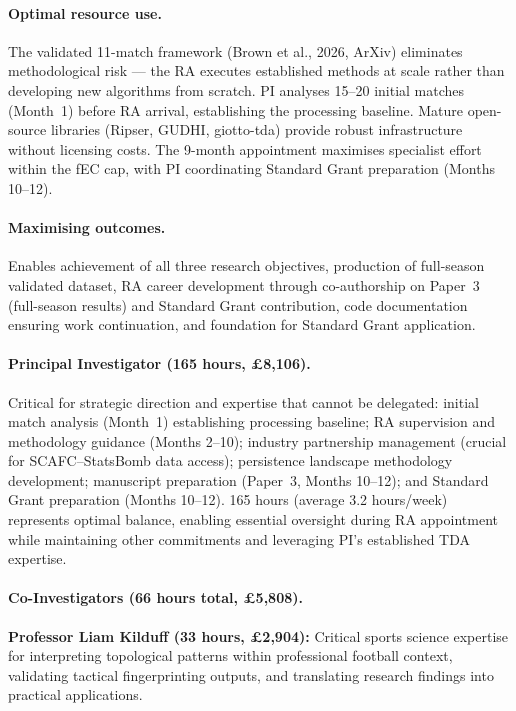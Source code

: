 \paragraph{Optimal resource use.}
The validated 11-match framework (Brown et al., 2026, ArXiv) eliminates methodological risk --- the RA executes established methods at scale rather than developing new algorithms from scratch. PI analyses 15--20 initial matches (Month~1) before RA arrival, establishing the processing baseline. Mature open-source libraries (Ripser, GUDHI, giotto-tda) provide robust infrastructure without licensing costs. The 9-month appointment maximises specialist effort within the fEC cap, with PI coordinating Standard Grant preparation (Months 10--12).

\paragraph{Maximising outcomes.}
Enables achievement of all three research objectives, production of full-season validated dataset, RA career development through co-authorship on Paper~3 (full-season results) and Standard Grant contribution, code documentation ensuring work continuation, and foundation for Standard Grant application.

\paragraph{Principal Investigator (165 hours, \pounds8{,}106).}
Critical for strategic direction and expertise that cannot be delegated: initial match analysis (Month~1) establishing processing baseline; RA supervision and methodology guidance (Months 2--10); industry partnership management (crucial for SCAFC--StatsBomb data access); persistence landscape methodology development; manuscript preparation (Paper~3, Months 10--12); and Standard Grant preparation (Months 10--12). 165 hours (average 3.2 hours/week) represents optimal balance, enabling essential oversight during RA appointment while maintaining other commitments and leveraging PI's established TDA expertise.

\paragraph{Co-Investigators (66 hours total, \pounds5{,}808).}

\textbf{Professor Liam Kilduff (33 hours, \pounds2{,}904):} Critical sports science expertise for interpreting topological patterns within professional football context, validating tactical fingerprinting outputs, and translating research findings into practical applications.

